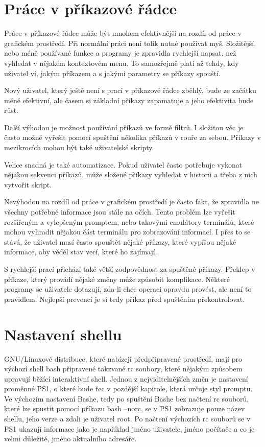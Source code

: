 \documentclass[thesis=M,czech]{FITthesis}[2012/06/26]
\begin{document}
%
%
%
\section{Práce v příkazové řádce}

Práce v příkazové řádce může být mnohem efektivnější na rozdíl od práce v grafickém prostředí. Při normální práci není tolik nutné používat myš. Složitější, nebo méně používané funkce a programy je zpravidla rychlejší napsat, než vyhledat v nějakém kontextovém menu. To samozřejmě platí až tehdy, kdy uživatel ví, jakým příkazem a s jakými parametry se příkazy spouští.

Nový uživatel, který ještě není s prací v příkazové řádce zběhlý, bude ze začátku méně efektivní, ale časem si základní příkazy zapamatuje a jeho efektivita bude růst.

Další výhodou je možnost používání příkazů ve formě filtrů. I složitou věc je často možné vyřešit pomocí spuštění několika příkazů v rouře za sebou. Příkazy v mezikrocích mohou být také uživatelské skripty.

Velice snadná je také automatizace. Pokud uživatel často potřebuje vykonat nějakou sekvenci příkazů, může složené příkazy vyhledat v historii a třeba z nich vytvořit skript.

Nevýhodou na rozdíl od práce v grafickém prostředí je často fakt, že zpravidla ne všechny potřebné informace jsou stále na očích. Tento problém lze vyřešit rozšířeným a vylepšeným promptem, nebo takovými emulátory terminálů, které mohou vyhradit nějakou část terminálu pro zobrazování informací. I přes to se stává, že uživatel musí často spouštět nějaké příkazy, které vypíšou nějaké informace, aby věděl stav vecí, které ho zajímají.

S rychlejší prací přichází také větší zodpovědnost za spuštěné příkazy. Překlep v příkaze, který provádí nějaké změny může způsobit komplikace. Některé programy se uživatele dotazují, zda-li chce operaci opravdu provést, ale není to pravidlem. Nejlepší prevencí je si tedy příkaz před spuštěním překontrolovat.


%
%
%
\section{Nastavení shellu}

GNU/Linuxové distribuce, které nabízejí předpřipravené prostředí, mají pro výchozí shell bash připravené takzvané rc soubory, které nějakým způsobem upravují běžící interaktivní shell. Jednou z nejviditelnějších změn je nastavení proměnné PS1, o které bude řec v pozdější kapitole, která určuje styl promptu. Ve výchozím nastavení Bashe, tedy po spuštění Bashe bez načtení rc souborů, které lze spustit pomocí příkazu bash --norc, se v PS1 zobrazuje pouze název shellu, jeho verze a zdali je uživatel root. Po načtení výchozích rc souborů se v PS1 ukazují informace jako je například jméno uživatele, jméno počítače a co je velmi důležité, jméno aktualního adresáře.
\end{document}
